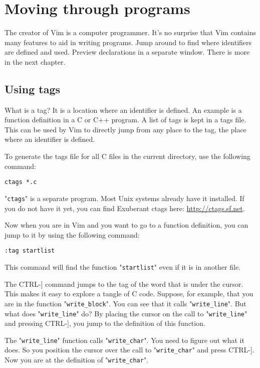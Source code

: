 \section{Moving through programs}
The creator of Vim is a computer programmer.
It's no surprise that Vim contains many features to aid in writing programs.
Jump around to find where identifiers are defined and used.
Preview declarations in a separate window.
There is more in the next chapter.
\subsection{Using tags}
\label{Using tags}
What is a tag?  It is a location where an identifier is defined.
An example is a function definition in a C or C++ program.
A list of tags is kept in a tags file.
This can be used by Vim to directly jump from any place to the tag, the place where an identifier is defined.

To generate the tags file for all C files in the current directory, use the following command:

\begin{Verbatim}[samepage=true]
 ctags *.c
\end{Verbatim}

"\verb!ctags!" is a separate program.
Most Unix systems already have it installed.
If you do not have it yet, you can find Exuberant ctags here: \url{http://ctags.sf.net}.

Now when you are in Vim and you want to go to a function definition, you can jump to it by using the following command:

\begin{Verbatim}[samepage=true]
 :tag startlist
\end{Verbatim}

This command will find the function "\verb!startlist!" even if it is in another file.

The CTRL-] command jumps to the tag of the word that is under the cursor.
This makes it easy to explore a tangle of C code.
Suppose, for example, that you are in the function "\verb!write_block!".
You can see that it calls "\verb!write_line!".
But what does "\verb!write_line!" do?  By placing the cursor on the call to "\verb!write_line!" and pressing CTRL-], you jump to the definition of this function.

The "\verb!write_line!" function calls "\verb!write_char!".
You need to figure out what it does.
So you position the cursor over the call to "\verb!write_char!" and press CTRL-].
Now you are at the definition of "\verb!write_char!".

